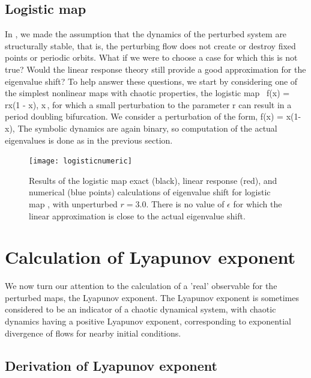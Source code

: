 \documentclass[aps,pre,
                showpacs,
                twocolumn,
                groupedaddress,
                floatfix]{revtex4-1}
\begin{document}

\subsection{Logistic map}
\label{sect:logstMap}

In , we made the assumption that the dynamics of the
perturbed system are structurally stable, that is, the perturbing flow
does not create or destroy fixed points or periodic orbits. What if we
were to choose a case for which this is not true? Would the linear
response theory still provide a good approximation for the eigenvalue
shift? To help answer these questions, we start by considering one of the
simplest nonlinear maps with chaotic properties, the logistic map\
\beq
f(x) = rx(1 - x), x\in [0, 1]
\,,
for which a small perturbation to the parameter r can result in a period
doubling bifurcation. We consider a perturbation of the form,
\beq
\epsilon \delta f(x) = \epsilon x(1-x), \mid \epsilon \mid {}
\eeq
The symbolic dynamics are again binary, so computation of the actual
eigenvalues is done as in the previous section.

\begin{figure}[htbp]
\texttt{[image: logisticnumeric]}
    \caption{\label{fig:logisticnumeric}
Results of the logistic map exact (black), linear response (red), and
numerical (blue points) calculations of eigenvalue shift for logistic map
\refeq{logstMap}, with unperturbed $r=3.0$. There is no value of
$\epsilon$ for which the linear approximation is close to the actual
eigenvalue shift.
        }
\end{figure}

\section{Calculation of Lyapunov exponent}
\label{sect:LyapExp}

We now turn our attention to the calculation of a 'real' observable for
the perturbed maps, the Lyapunov exponent. The Lyapunov exponent is
sometimes considered to be an indicator of a chaotic dynamical system,
with chaotic dynamics having a positive Lyapunov exponent, corresponding
to exponential divergence of flows for nearby initial conditions.

\subsection{Derivation of Lyapunov exponent}
\end{document}
